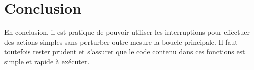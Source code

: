 \section{Conclusion}
En conclusion, il est pratique de pouvoir utiliser les interruptions pour effectuer des actions simples sans perturber outre mesure la boucle principale.
Il faut toutefois rester prudent et s'assurer que le code contenu dans ces fonctions est simple et rapide à exécuter.
